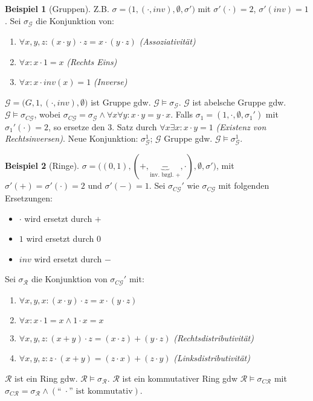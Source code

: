 \documentclass{article}
\theoremstyle{definition}
\newtheorem*{bsp}{Beispiel}
\theoremstyle{plain}
\newcommand{\m}[1]{\mathcal{#1}}
\begin{document}
    \begin{bsp}[Gruppen]
        Z.B. $ \sigma = \big(1, (\cdot, inv), \emptyset, \sigma'\big) $ mit $ \sigma'(\cdot) = 2 $, $ \sigma'(inv) = 1 $.
        Sei $ \sigma_{\m{G}} $ die Konjunktion von:
        \begin{enumerate}
            \item $ \forall x, y, z: (x \cdot y) \cdot z = x \cdot ( y \cdot z) $ \hfill \textit{(Assoziativität)}
            \item $ \forall x: x \cdot 1 = x $ \hfill \textit{(Rechts Eins)}
            \item $ \forall x: x \cdot inv(x) = 1 $ \hfill \textit{(Inverse)}
        \end{enumerate}
        $ \m{G} = \big(G, 1, (\cdot, inv), \emptyset\big) $ ist Gruppe gdw. $ \m{G} \models \sigma_{\m{G}} $.
        $ \m{G} $ ist abelsche Gruppe gdw. $ \m{G} \models \sigma_{C\m{G}} $, wobei $ \sigma_{C\m{G}} = \sigma_{\m{G}} \land \forall x \forall y: x \cdot y = y \cdot x $.
        Falls $ \sigma_1 = (1, \cdot, \emptyset, \sigma_1') $ mit $ \sigma_1'(\cdot) = 2 $, so ersetze den 3. Satz durch $ \forall x \exists x: x \cdot y = 1 $ \textit{(Existenz von Rechtsinversen)}.
        Neue Konjunktion: $ \sigma_{\m{G}}^1 $; $ \m{G} $ Gruppe gdw. $ \m{G} \models \sigma_{\m{G}}^1 $.
    \end{bsp}

    \begin{bsp}[Ringe]
        $ \sigma = \big((0, 1), (+, \underbrace{-}_{\text{inv. bzgl. }+}, \cdot), \emptyset, \sigma' \big) $, mit $ \sigma'(+) = \sigma'(\cdot) = 2 $ und $ \sigma'(-) = 1 $.
        Sei $ \sigma_{C\m{G}}' $ wie $ \sigma_{C\m{G}} $ mit folgenden Ersetzungen:
        \begin{itemize}
            \item $ \cdot $ wird ersetzt durch $ + $
            \item $ 1 $ wird ersetzt durch $ 0 $
            \item $ inv $ wird ersetzt durch $ - $
        \end{itemize}
        Sei $ \sigma_{\m{R}} $ die Konjunktion von $ \sigma_{C\m{G}}' $ mit:
        \begin{enumerate}
            \item $ \forall x, y, x : (x \cdot y) \cdot z = x \cdot (y \cdot z) $
            \item $ \forall x: x \cdot 1 = x \land 1 \cdot x = x $
            \item $ \forall x, y, z: (x + y) \cdot z = (x \cdot z) + (y \cdot z) $ \hfill \textit{(Rechtsdistributivität)}
            \item $ \forall x, y, z: z \cdot (x + y) = (z \cdot x) + (z \cdot y) $ \hfill \textit{(Linksdistributivität)}
        \end{enumerate}
        $ \m{R} $ ist ein Ring gdw. $ \m{R} \models \sigma_{\m{R}} $.
        $ \m{R} $ ist ein kommutativer Ring gdw $ \m{R} \models \sigma_{C\m{R}} $ mit $ \sigma_{C\m{R}} = \sigma_{\m{R}} \land (\text{``$\;\cdot$'' ist kommutativ}) $.
    \end{bsp}
\end{document}
